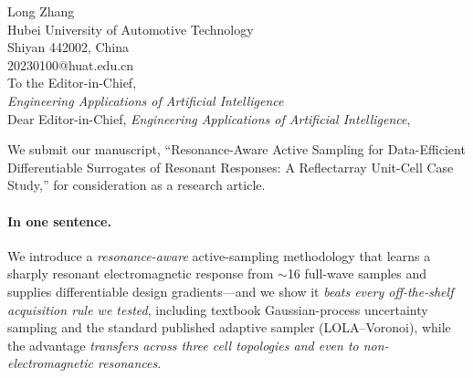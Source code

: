 \documentclass[11pt]{article}
\begin{document}
\thispagestyle{empty}
\noindent Long Zhang\\
Hubei University of Automotive Technology\\
Shiyan 442002, China\\
20230100@huat.edu.cn\\[6pt]
\noindent To the Editor-in-Chief,\\
\emph{Engineering Applications of Artificial Intelligence}\\[10pt]

\noindent Dear Editor-in-Chief, \emph{Engineering Applications of Artificial Intelligence},

We submit our manuscript, ``Resonance-Aware Active Sampling for Data-Efficient Differentiable Surrogates
of Resonant Responses: A Reflectarray Unit-Cell Case Study,'' for consideration as a research article.

\paragraph{In one sentence.} We introduce a \emph{resonance-aware} active-sampling methodology that learns a
sharply resonant electromagnetic response from $\sim$16 full-wave samples and supplies differentiable design
gradients---and we show it \emph{beats every off-the-shelf acquisition rule we tested}, including textbook
Gaussian-process uncertainty sampling and the standard published adaptive sampler (LOLA--Voronoi), while the
advantage \emph{transfers across three cell topologies and even to non-electromagnetic resonances}.
\end{document}
